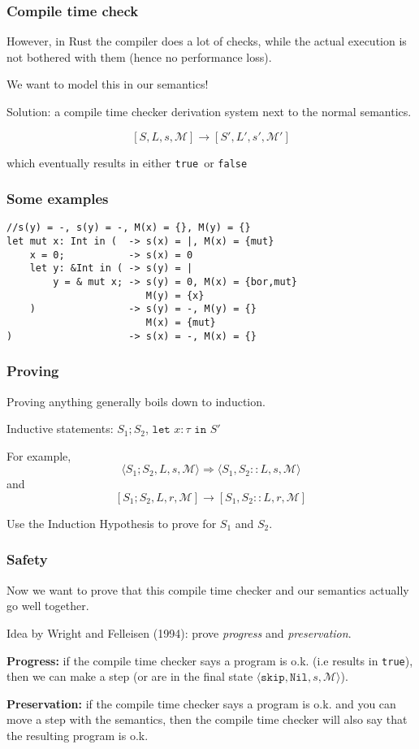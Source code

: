 \documentclass{beamer}
\newcommand{\sk}[0]{\texttt{skip}}
\newcommand{\nil}[0]{\texttt{Nil}}
\newcommand{\tr}[0]{\texttt{true}}
\newcommand{\fa}[0]{\texttt{false}}
\newcommand{\letm}[2]{\texttt{let }#1 : \tau \texttt{ in } #2}
\newcommand{\sosb}[4]{\langle #1, #2, #3, \mathcal{#4} \rangle}
\newcommand{\ccb}[4]{[ #1, #2, #3, \mathcal{#4} ]}
\begin{document}
\begin{frame}[fragile]
\frametitle{Compile time check}
However, in Rust the compiler does a lot of checks, while the actual execution is not bothered with them (hence no performance loss).

We want to model this in our semantics!

Solution: a compile time checker derivation system next to the normal semantics.

$$\ccb{S}{L}{s}{M} \to \ccb{S'}{L'}{s'}{M'}$$

which eventually results in either \tr ~or \fa
\end{frame}


\begin{frame}[fragile]
\frametitle{Some examples}
\begin{lstlisting}
//s(y) = -, s(y) = -, M(x) = {}, M(y) = {}                          
let mut x: Int in (  -> s(x) = |, M(x) = {mut}
    x = 0;           -> s(x) = 0
    let y: &Int in ( -> s(y) = |
        y = & mut x; -> s(y) = 0, M(x) = {bor,mut}
                        M(y) = {x}
    )                -> s(y) = -, M(y) = {}
                        M(x) = {mut}
)                    -> s(x) = -, M(x) = {}
\end{lstlisting}
\end{frame}



\begin{frame}
\frametitle{Proving}
Proving anything generally boils down to induction.

Inductive statements:  $S_1; S_2$, $\letm{x}{S'}$

For example, 
$$\sosb{S_1; S_2}{L}{s}{M} \Rightarrow \sosb{S_1}{S_2::L}{s}{M}$$
and
$$\ccb{S_1; S_2}{L}{r}{M} \to \ccb{S_1}{S_2::L}{r}{M}$$

Use the Induction Hypothesis to prove for $S_1$ and $S_2$. 
\end{frame}



\begin{frame}
\frametitle{Safety}
Now we want to prove that this compile time checker and our semantics actually go well together.

Idea by Wright and Felleisen (1994): prove \emph{progress} and \emph{preservation}.

\vspace{0.7cm}
\textbf{Progress:} if the compile time checker says a program is o.k. (i.e results in \tr), then we can make a step (or are in the final state $\sosb{\sk}{\nil}{s}{M}$).

\vspace{0.2cm}
\textbf{Preservation:} if the compile time checker says a program is o.k. and you can move a step with the semantics, then the compile time checker will also say that the resulting program is o.k.
\end{frame}
\end{document}

